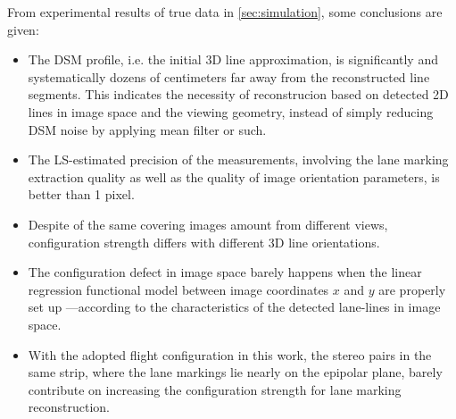 From experimental results of true data in \cref{sec:simulation}, some conclusions are given:
\begin{itemize}
	\item The DSM profile, i.e. the initial 3D line approximation, is significantly and systematically dozens of centimeters far away from the reconstructed line segments. This indicates the necessity of reconstrucion based on detected 2D lines in image space and the viewing geometry, instead of simply reducing DSM noise by applying mean filter or such.
	
	\item The LS-estimated precision of the measurements, involving the lane marking extraction quality as well as the quality of image orientation parameters, is better than 1 pixel.
	
	\item Despite of the same covering images amount from different views, configuration strength differs with different 3D line orientations.
	
	\item The configuration defect in image space %
	barely happens when the linear regression functional model between image coordinates $x$ and $y$ are properly set up ---according to the characteristics of the detected lane-lines in image space.
	
	\item  %
	With the adopted flight configuration in this work, the stereo pairs in the same strip, where the lane markings lie nearly on the epipolar plane, barely contribute on increasing the configuration strength for lane marking reconstruction. 
	
\end{itemize}




